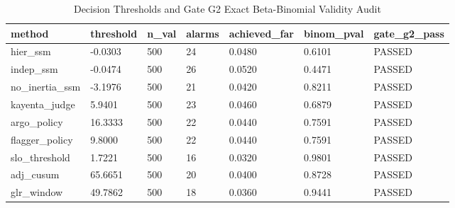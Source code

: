 \begin{table}[htbp]
\centering
\caption{Decision Thresholds and Gate G2 Exact Beta-Binomial Validity Audit}
\label{tab:table_T7_calibration_gate_g2}
\begin{tabular}{lllllll}
\hline
method & threshold & n\_val & alarms & achieved\_far & binom\_pval & gate\_g2\_pass \\
\hline
hier\_ssm & -0.0303 & 500 & 24 & 0.0480 & 0.6101 & PASSED \\
indep\_ssm & -0.0474 & 500 & 26 & 0.0520 & 0.4471 & PASSED \\
no\_inertia\_ssm & -3.1976 & 500 & 21 & 0.0420 & 0.8211 & PASSED \\
kayenta\_judge & 5.9401 & 500 & 23 & 0.0460 & 0.6879 & PASSED \\
argo\_policy & 16.3333 & 500 & 22 & 0.0440 & 0.7591 & PASSED \\
flagger\_policy & 9.8000 & 500 & 22 & 0.0440 & 0.7591 & PASSED \\
slo\_threshold & 1.7221 & 500 & 16 & 0.0320 & 0.9801 & PASSED \\
adj\_cusum & 65.6651 & 500 & 20 & 0.0400 & 0.8728 & PASSED \\
glr\_window & 49.7862 & 500 & 18 & 0.0360 & 0.9441 & PASSED \\
\hline
\end{tabular}
\end{table}
